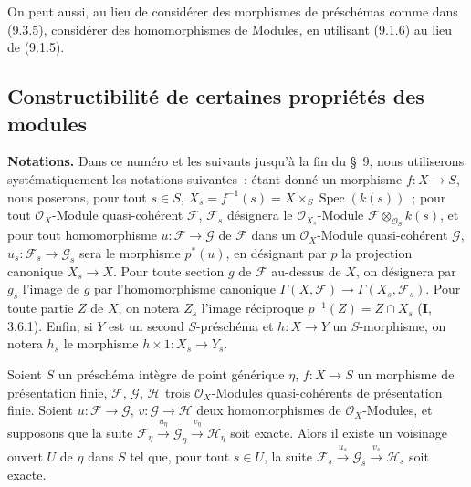 On peut aussi, au lieu de considérer des morphismes de préschémas comme dans
(9.3.5), considérer des homomorphismes de Modules, en utilisant (9.1.6) au
lieu de (9.1.5).


\subsection{Constructibilité de certaines propriétés des modules}
\label{subsection:IV.9.4-fr}

\begin{env}[9.4.1]
\label{IV.9.4.1-fr}
\textbf{Notations.} Dans ce numéro et les suivants jusqu'à la fin du \S~9,
nous utiliserons systématiquement les notations suivantes~: étant donné un
morphisme $f:X\to S$, nous poserons, pour tout $s\in S$,
$X_s=f^{-1}(s)=X\times_S\operatorname{Spec}(k(s))$~; pour tout
$\mathcal O_X$-Module quasi-cohérent $\mathcal F$, $\mathcal F_s$ désignera
le $\mathcal O_{X_s}$-Module
$\mathcal F\otimes_{\mathcal O_S}k(s)$, et pour tout homomorphisme
$u:\mathcal F\to\mathcal G$ de $\mathcal F$ dans un $\mathcal O_X$-Module
quasi-cohérent $\mathcal G$, $u_s:\mathcal F_s\to\mathcal G_s$ sera le
morphisme $p^*(u)$, en désignant par $p$ la projection canonique $X_s\to X$.
Pour toute section $g$ de $\mathcal F$ au-dessus de $X$, on désignera par
$g_s$ l'image de $g$ par l'homomorphisme canonique
$\Gamma(X,\mathcal F)\to\Gamma(X_s,\mathcal F_s)$. Pour toute partie $Z$ de
$X$, on notera $Z_s$ l'image réciproque
$p^{-1}(Z)=Z\cap X_s$ (\textbf{I}, 3.6.1). Enfin, si $Y$ est un second
$S$-préschéma et $h:X\to Y$ un $S$-morphisme, on notera $h_s$ le morphisme
$h\times1:X_s\to Y_s$.
\end{env}

\begin{proposition}[9.4.2]
\label{IV.9.4.2-fr}
Soient $S$ un préschéma intègre de point générique $\eta$, $f:X\to S$ un
morphisme de présentation finie, $\mathcal F$, $\mathcal G$, $\mathcal H$
trois $\mathcal O_X$-Modules quasi-cohérents de présentation finie. Soient
$u:\mathcal F\to\mathcal G$, $v:\mathcal G\to\mathcal H$ deux
homomorphismes de $\mathcal O_X$-Modules, et supposons que la suite
$\mathcal F_\eta\xrightarrow{u_\eta}\mathcal G_\eta
\xrightarrow{v_\eta}\mathcal H_\eta$ soit exacte. Alors il existe un
voisinage ouvert $U$ de $\eta$ dans $S$ tel que, pour tout $s\in U$, la suite
$\mathcal F_s\xrightarrow{u_s}\mathcal G_s
\xrightarrow{v_s}\mathcal H_s$ soit exacte.
\end{proposition}

